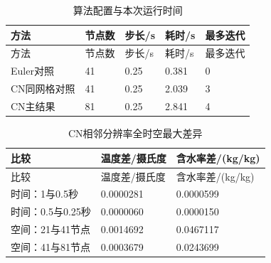 \begin{longtable}{P{0.28}P{0.14}P{0.14}P{0.14}P{0.14}}
\caption{算法配置与本次运行时间}\label{tab:method}\\
\toprule 方法 & 节点数 & 步长/s & 耗时/s & 最多迭代\\
\midrule\endfirsthead
\toprule 方法 & 节点数 & 步长/s & 耗时/s & 最多迭代\\
\midrule\endhead
\bottomrule\endfoot
Euler对照 & 41 & 0.25 & 0.381 & 0\\
CN同网格对照 & 41 & 0.25 & 2.039 & 3\\
CN主结果 & 81 & 0.25 & 2.841 & 4\\
\end{longtable}
\begin{longtable}{P{0.42}P{0.25}P{0.25}}
\caption{CN相邻分辨率全时空最大差异}\label{tab:convergence}\\
\toprule 比较 & 温度差/摄氏度 & 含水率差/(kg/kg)\\
\midrule\endfirsthead
\toprule 比较 & 温度差/摄氏度 & 含水率差/(kg/kg)\\
\midrule\endhead
\bottomrule\endfoot
时间：1与0.5秒 & 0.0000281 & 0.0000599\\
时间：0.5与0.25秒 & 0.0000060 & 0.0000150\\
空间：21与41节点 & 0.0014692 & 0.0467117\\
空间：41与81节点 & 0.0003679 & 0.0243699\\
\end{longtable}
